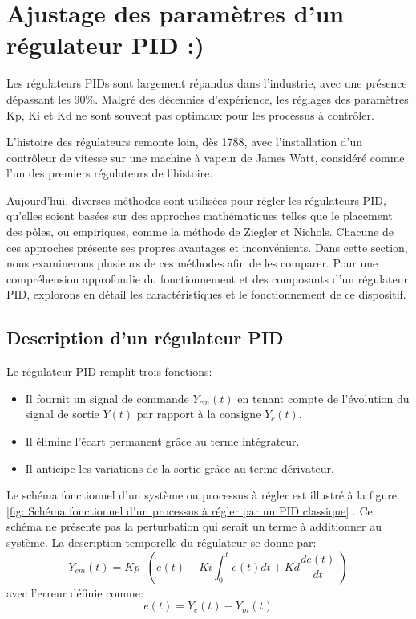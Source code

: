 \section{Ajustage des paramètres d'un régulateur PID :)}

Les régulateurs PIDs sont largement répandus dans l'industrie, avec une présence dépassant les 90\%. Malgré des décennies d'expérience, les réglages des paramètres Kp, Ki et Kd ne sont souvent pas optimaux pour les processus à contrôler. 

L'histoire des régulateurs remonte loin, dès 1788, avec l'installation d'un contrôleur de vitesse sur une machine à vapeur de James Watt, considéré comme l'un des premiers régulateurs de l'histoire.

Aujourd'hui, diverses méthodes sont utilisées pour régler les régulateurs PID, qu'elles soient basées sur des approches mathématiques telles que le placement des pôles, ou empiriques, comme la méthode de Ziegler et Nichols. Chacune de ces approches présente ses propres avantages et inconvénients. Dans cette section, nous examinerons plusieurs de ces méthodes afin de les comparer. Pour une compréhension approfondie du fonctionnement et des composants d'un régulateur PID, explorons en détail les caractéristiques et le fonctionnement de ce dispositif.\cite{EIVD}

\subsection{Description d'un régulateur PID}

Le régulateur PID remplit trois fonctions:
\begin{itemize}
	\item Il fournit un signal de commande $Y_{cm}(t)$ en tenant compte de l'évolution du signal de sortie $Y(t)$ par rapport à la consigne $Y_c(t)$.
	\item Il élimine l'écart permanent grâce au terme intégrateur.
	\item Il anticipe les variations de la sortie grâce au terme dérivateur.
\end{itemize}
Le schéma fonctionnel d'un système ou processus à régler est illustré à la figure \ref{fig: Schéma fonctionnel d'un processus à régler par un PID classique} . Ce schéma ne présente pas la perturbation qui serait un terme à additionner au système. La description temporelle du régulateur se donne par:
\begin{equation}
	Y_{cm}(t)=Kp\cdot  \left( e(t)+Ki\int_{0}^{t}e(t)dt+Kd\frac{de(t)}{dt} \ \right)
	\label{eq: PID temporel}
\end{equation}
avec l'erreur définie comme:
\begin{equation}
	e(t)=Y_c(t)-Y_m(t)
	\label{eq: erreur}
\end{equation}

